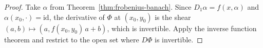 \begin{proof}
  \leanok
  Take $\alpha$ from Theorem~\ref{thm:frobenius-banach}. Since $D_1\alpha = f(x, \alpha)$ and
  $\alpha(x_0, \cdot) = \mathrm{id}$, the derivative of $\Phi$ at $(x_0, y_0)$ is the shear
  $(a, b) \mapsto (a, f(x_0, y_0)\,a + b)$, which is invertible. Apply the inverse function
  theorem and restrict to the open set where $D\Phi$ is invertible.
\end{proof}
